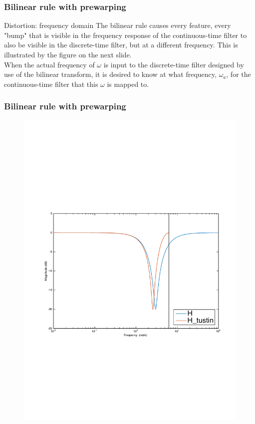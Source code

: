 \begin{frame}
	\frametitle{Bilinear rule with prewarping}
	\begin{block}{Distortion: frequency domain}
		The bilinear rule causes every feature, every "bump" that is visible in the frequency response of the continuous-time filter to also be visible in the discrete-time filter, but at a different frequency. This is illustrated by the figure on the next slide.\\
		\vspace{1em}
		When the actual frequency of $\omega$ is input to the discrete-time filter designed by use of the bilinear transform, it is desired to know at what frequency,  $\omega_a$, for the continuous-time filter that this  $\omega$ is mapped to.
	\end{block}
\end{frame}

\begin{frame}
	\frametitle{Bilinear rule with prewarping}
	\vspace{-0.5em}
	\begin{figure}
		\centering
		\includegraphics[width=0.85\linewidth]{Distortion_bode}
	\end{figure}
\end{frame}

